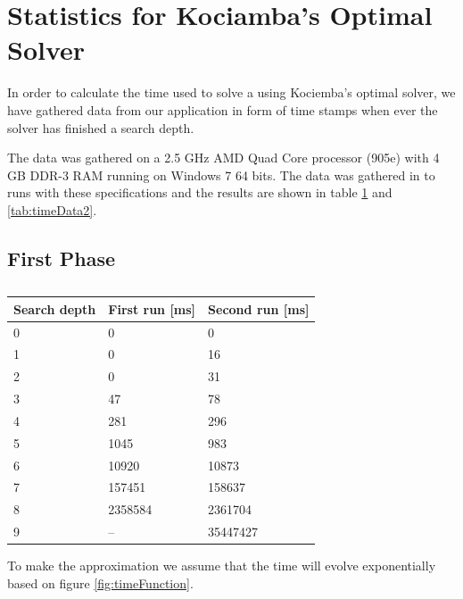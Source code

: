 \section{Statistics for Kociamba's Optimal Solver}
\label{app:kociembaTime}
In order to calculate the time used to solve a \rubik{} using Kociemba's optimal solver, we have gathered data from our application in form of time stamps when ever the solver has finished a search depth.

The data was gathered on a 2.5 GHz AMD Quad Core processor (905e) with 4 GB DDR-3 RAM running on Windows 7 64 bits.
The data was gathered in to runs with these specifications and the results are shown in table \ref{tab:timeData} and \ref{tab:timeData2}.

\subsection{First Phase}

\begin{table}[hb]
\centering
	\begin{tabular}{|l|l|l|}
	\hline
	Search depth&First run [ms]&Second run [ms]\\
	\hline
	0&0&0\\
	\hline
	1&0&16\\
	\hline
	2&0&31\\
	\hline
	3&47&78\\
	\hline
	4&281&296\\
	\hline
	5&1045&983\\
	\hline
	6&10920&10873\\
	\hline
	7&157451&158637\\
	\hline
	8&2358584&2361704\\
	\hline
	9&--&35447427\\
	\hline
	\end{tabular}
\caption{}
	\label{tab:timeData}
\end{table}

To make the approximation we assume that the time will evolve exponentially based on figure \ref{fig:timeFunction}.

